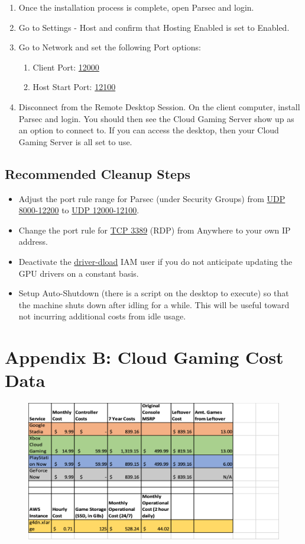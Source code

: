\documentclass[titlepage, 12pt]{article}
\begin{document}
\begin{enumerate}
\begin{figure}[ht]
		\end{figure}
	\item{Once the installation process is complete, open Parsec and login.}
	\item{Go to Settings - Host and confirm that Hosting Enabled is set to Enabled.}
	\item{Go to Network and set the following Port options:}
		\begin{enumerate}
		\item{Client Port: \underline{12000}}
		\item{Host Start Port: \underline{12100}}
		\end{enumerate}
	\item{Disconnect from the Remote Desktop Session. On the client computer, install Parsec and login. You should then see the Cloud Gaming Server show up as an option to connect to. If you can access the desktop, then your Cloud Gaming Server is all set to use. }
	\end{enumerate}

	\subsection*{Recommended Cleanup Steps}

	\begin{itemize}
	\item {Adjust the port rule range for Parsec (under Security Groups) from \underline{UDP 8000-12200} to \underline{UDP 12000-12100}. }
	\item {Change the port rule for \underline{TCP 3389} (RDP) from Anywhere to your own IP address.}
	\item {Deactivate the \underline{driver-dload} IAM user if you do not anticipate updating the GPU drivers on a constant basis.}
	\item {Setup Auto-Shutdown (there is a script on the desktop to execute) so that the machine shuts down after idling for a while. This will be useful toward not incurring additional costs from idle usage.}
	\end{itemize}

\newpage
\section{Appendix B: Cloud Gaming Cost Data}

\begin{figure}[ht]
\centering
\includegraphics{costdata.png}
\end{figure}
\end{document}
